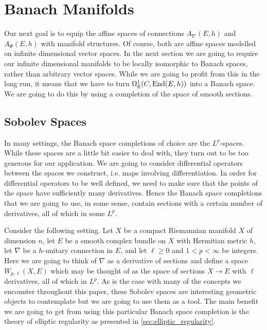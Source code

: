 \documentclass[12pt]{ociamthesis}  %
\begin{document}
\section{Banach Manifolds}

Our next goal is to equip the affine spaces of connections $A_\nabla(E,h)$
and $A_\Phi (E,h)$ with manifold structures. Of course, both are affine
spaces modelled on infinite dimensional vector spaces. In the next
section we are going to require our infinite dimensional manifolds to
be locally isomorphic to Banach spaces, rather than arbitrary
vector spaces. While we are going to profit from this in the long run,
it means that we have to turn $\Omega^1_{\mathbb{R}}(C,\operatorname{End}(E,h))$
into a Banach space. We are going to do this by using a completion of
the space of smooth sections.

\subsection{Sobolev Spaces}

In many settings, the Banach space completions of choice are the
$L^p$-spaces. While these spaces are a little bit easier to deal with,
they turn out to be too generous for our application. We are going to
consider differential operators between the spaces we construct,
i.e. maps involving differentiation. In order for differential operators
to be well defined, we need to make sure that the points of the space
have sufficiently many derivatives. Hence the Banach space completions
that we are going to use, in some sense, contain sections with a
certain number of derivatives, all of which in some $L^p$.

Consider the following setting. Let $X$ be a compact
Riemannian manifold $X$ of dimension $n$, let $E$ be a smooth complex
bundle on $X$ with Hermitian metric $h$, let $\nabla$ be a $h$-unitary
connection in $E$, and let $\ell\geq 0$ and $1<p<\infty$ be integers.
Here we are going to think of $\nabla$ as a derivative of sections and
define a space $W_{p,\ell}(X,E)$ which may be thought of as the space of
sections $X\to E$ with $\ell$ derivatives, all of which in $L^p$. As
is the case with many of the concepts we encounter throughout this paper,
these Sobolev spaces are interesting geometric objects to
contemplate but we are going to use them as a tool. The main
benefit we are going to get from using this particular Banach space
completion is the theory of elliptic regularity as presented in
\ref{sec:elliptic_regularity}.
\end{document}
